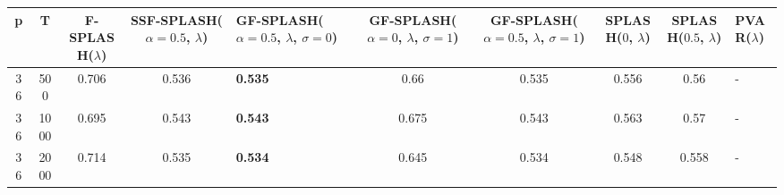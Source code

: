 \begin{tabular}{cccclccccl}
\hline
  p  &  T   &  F-SPLASH($\lambda$)  &  SSF-SPLASH($\alpha=0.5$, $\lambda$)  & GF-SPLASH($\alpha=0.5$, $\lambda$, $\sigma=0$)   &  GF-SPLASH($\alpha=0$, $\lambda$, $\sigma=1$)  &  GF-SPLASH($\alpha=0.5$, $\lambda$, $\sigma=1$)  &  SPLASH($0$, $\lambda$)  &  SPLASH($0.5$, $\lambda$)  & PVAR($\lambda$)   \\
\hline
 36  & 500  &         0.706         &                 0.536                 & \textbf{0.535}                                   &                      0.66                      &                      0.535                       &          0.556           &            0.56            & -                 \\
 36  & 1000 &         0.695         &                 0.543                 & \textbf{0.543}                                   &                     0.675                      &                      0.543                       &          0.563           &            0.57            & -                 \\
 36  & 2000 &         0.714         &                 0.535                 & \textbf{0.534}                                   &                     0.645                      &                      0.534                       &          0.548           &           0.558            & -                 \\
\hline
\end{tabular}